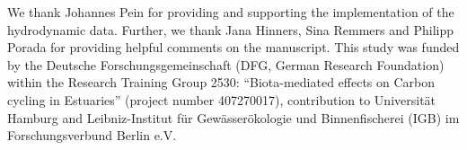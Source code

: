 \documentclass[npg, manuscript]{copernicus}
\begin{document}





\begin{acknowledgements}
We thank Johannes Pein for providing and supporting the implementation of the hydrodynamic data.
Further, we thank Jana Hinners, Sina Remmers and Philipp Porada for providing helpful comments on the manuscript.
This study was funded by the Deutsche Forschungsgemeinschaft (DFG, German Research Foundation) within the Research Training Group 2530: “Biota-mediated effects on Carbon cycling in Estuaries” (project number 407270017), contribution to Universität Hamburg and Leibniz-Institut für Gewässerökologie und Binnenfischerei (IGB) im Forschungsverbund Berlin e.V.
\end{acknowledgements}






  





\end{document}
